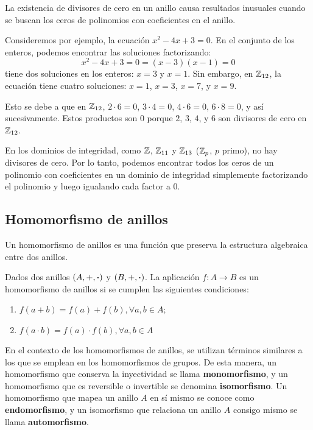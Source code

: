 \begin{fmd-example}
	La existencia de divisores de cero en un anillo causa resultados inusuales cuando se buscan los ceros de polinomios con coeficientes en el anillo.
	
	Consideremos por ejemplo, la ecuación $x^2 - 4x + 3 = 0$. En el conjunto de los enteros, podemos encontrar las soluciones factorizando:
	\[ x^2 - 4x + 3 = 0 = (x - 3)(x-1) = 0\]
	tiene dos soluciones en los enteros: $x = 3$ y $x = 1$. Sin embargo, en $\mathbb{Z}_{12}$, la ecuación tiene cuatro soluciones: $x = 1$, $x = 3$, $x = 7$, y $x = 9$.
	
	Esto se debe a que en $\mathbb{Z}_{12}$, $2 \cdot 6 = 0$, $3 \cdot 4 = 0$, $4 \cdot 6 = 0$, $6 \cdot 8 = 0$, y así sucesivamente. Estos productos son 0 porque $2$, $3$, $4$, y $6$ son divisores de cero en $\mathbb{Z}_{12}$.
	
	En los dominios de integridad, como $\mathbb{Z}$, $\mathbb{Z}_{11}$ y $\mathbb{Z}_{13}$ ($\mathbb{Z}_p$, $p$ primo), no hay divisores de cero. Por lo tanto, podemos encontrar todos los ceros de un polinomio con coeficientes en un dominio de integridad simplemente factorizando el polinomio y luego igualando cada factor a 0.
\end{fmd-example}

\subsection{Homomorfismo de anillos}

Un homomorfismo de anillos es una función que preserva la estructura algebraica entre dos anillos.

\begin{fmd-definition}
	Dados dos anillos $(A, +, \boldsymbol{\cdot})$ y $(B, +, \boldsymbol{\cdot})$. La aplicación $f: A \rightarrow B$ es un homomorfismo de anillos si se cumplen las siguientes condiciones:
	\begin{enumerate}
		\item $f(a + b) = f(a) + f(b), \forall a, b \in A$;
		\item $f(a\cdot b) = f(a) \cdot f(b), \forall a, b \in A$
	\end{enumerate}
\end{fmd-definition}

En el contexto de los homomorfismos de anillos, se utilizan términos similares a los que se emplean en los homomorfismos de grupos. De esta manera, un homomorfismo que conserva la inyectividad se llama \textbf{monomorfismo}, y un homomorfismo que es reversible o invertible se denomina \textbf{isomorfismo}. Un homomorfismo que mapea un anillo $A$ en sí mismo se conoce como \textbf{endomorfismo}, y un isomorfismo que relaciona un anillo $A$ consigo mismo se llama \textbf{automorfismo}.

